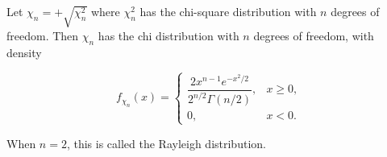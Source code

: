 Let $\chi_n = +\sqrt{\chi_n^2}$ where $\chi_n^2$ has the chi-square distribution with $n$ degrees of freedom. Then $\chi_n$ has the chi distribution with $n$ degrees of freedom, with density

$$f_{\chi_n}(x) = \begin{cases} \dfrac{2 x^{n-1} e^{-x^2/2}}{2^{n/2} \Gamma(n/2)}, & x \geq 0, \\[8pt] 0, & x < 0. \end{cases}$$

When $n = 2$, this is called the Rayleigh distribution.

